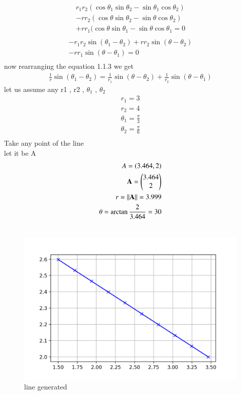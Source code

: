 \documentclass[journal,12pt,twocolumn]{IEEEtran}
\renewcommand\thesection{\arabic{section}}
\begin{document}
\begin{enumerate}[label=\thesection.\arabic*.,ref=\thesection.\theenumi]
\begin{align}\nonumber
 r_1r_2(\cos\theta_1\sin\theta_2-\sin\theta_1\cos\theta_2)\\\nonumber
 -rr_2(\cos\theta\sin\theta_2-\sin\theta\cos\theta_2)\\\nonumber
 +rr_1(\cos\theta\sin\theta_1-\sin\theta\cos\theta_1=0\\
\end{align}
\begin{align}\nonumber
-r_1r_2\sin(\theta_1-\theta_2)+rr_2\sin(\theta-\theta_2)\\\nonumber
-rr_1\sin(\theta-\theta_1)=0\\
\end{align}
now rearranging the equation 1.1.3 we get 
\begin{align}
\frac{1}{r} \sin{(\theta_1-\theta_2)}=\frac{1}{r_1} \sin{(\theta-\theta_2)}+\frac{1}{r_2} \sin{(\theta-\theta_1)}
 \end{align}
 let us assume  any r1 , r2 , $\theta_1$ , $\theta_2$\\
 \begin{align}
     r_1=3\\
     r_2=4\\
     \theta_1=\frac{\pi}{3}\\
     \theta_2=\frac{\pi}{6}\\\nonumber
 \end{align}
 Take any point of the line \\
 let it be A\\
\begin{align}
A=(3.464,2)\\
\mathbf{A}=\begin{pmatrix}3.464\\2\end{pmatrix}\\
r=\lVert\mathbf{A}\rVert=3.999\\
\theta=\arctan\frac{2}{3.464}=30\\\nonumber
\end{align}

 
 \begin{figure}[!ht]
	\centering
	\includegraphics[width=\columnwidth]{line.png}
	\caption{line generated}
	\label{fig:line}
\end{figure}

\end{enumerate}
\end{document}
